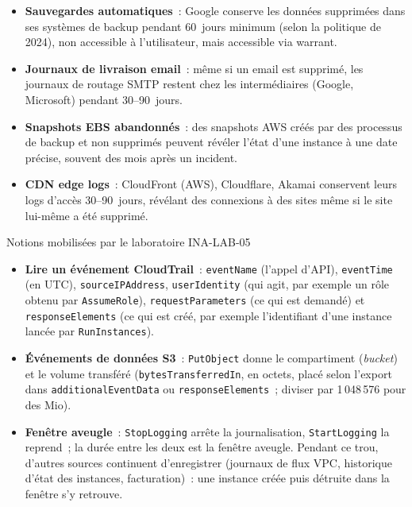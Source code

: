 \begin{itemize}
    \item \textbf{Sauvegardes automatiques}~: Google conserve les données
          supprimées dans ses systèmes de backup pendant 60~jours minimum
          (selon la politique de 2024), non accessible à l'utilisateur,
          mais accessible via warrant.
    \item \textbf{Journaux de livraison email}~: même si un email est
          supprimé, les journaux de routage SMTP restent chez les
          intermédiaires (Google, Microsoft) pendant 30--90~jours.
    \item \textbf{Snapshots EBS abandonnés}~: des snapshots AWS créés
          par des processus de backup et non supprimés peuvent révéler
          l'état d'une instance à une date précise, souvent des mois
          après un incident.
    \item \textbf{CDN edge logs}~: CloudFront (AWS), Cloudflare, Akamai
          conservent leurs logs d'accès 30--90~jours, révélant
          des connexions à des sites même si le site lui-même a été
          supprimé.
\end{itemize}

\separateur

\begin{boiteRemarque}{Notions mobilisées par le laboratoire INA-LAB-05}
\begin{itemize}
    \item \textbf{Lire un événement CloudTrail}~: \texttt{eventName} (l'appel
          d'API), \texttt{eventTime} (en UTC), \texttt{sourceIPAddress},
          \texttt{userIdentity} (qui agit, par exemple un rôle obtenu par
          \texttt{AssumeRole}), \texttt{requestParameters} (ce qui est
          demandé) et \texttt{responseElements} (ce qui est créé, par exemple
          l'identifiant d'une instance lancée par \texttt{RunInstances}).
    \item \textbf{Événements de données S3}~: \texttt{PutObject} donne le
          compartiment (\emph{bucket}) et le volume transféré
          (\texttt{bytesTransferredIn}, en octets, placé selon l'export dans
          \texttt{additionalEventData} ou \texttt{responseElements}~;
          diviser par 1\,048\,576 pour des Mio).
    \item \textbf{Fenêtre aveugle}~: \texttt{StopLogging} arrête la
          journalisation, \texttt{StartLogging} la reprend~; la durée entre
          les deux est la fenêtre aveugle. Pendant ce trou, d'autres sources
          continuent d'enregistrer (journaux de flux VPC, historique d'état
          des instances, facturation)~: une instance créée puis détruite dans
          la fenêtre s'y retrouve.
\end{itemize}
\end{boiteRemarque}


